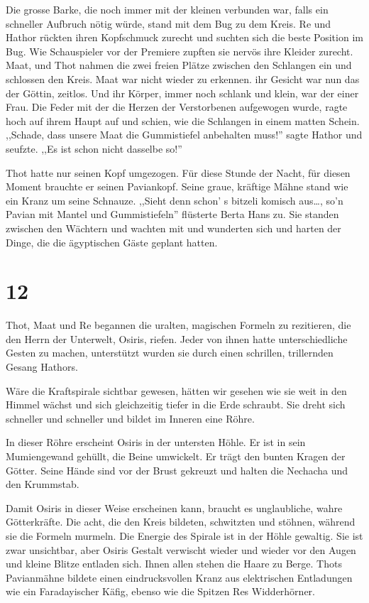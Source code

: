 \documentclass[11pt,titlepage,a5paper]{book}
\begin{document}
Die grosse Barke, die noch immer mit der kleinen verbunden war, falls ein schneller Aufbruch nötig würde, stand mit dem Bug zu dem Kreis. Re und Hathor rückten ihren Kopfschmuck zurecht und suchten sich die beste Position im Bug. Wie Schauspieler vor der Premiere zupften sie nervös ihre Kleider zurecht. Maat, und Thot nahmen die zwei freien Plätze zwischen den Schlangen ein und schlossen den Kreis. Maat war nicht wieder zu erkennen. ihr Gesicht war nun das der Göttin, zeitlos. Und ihr Körper, immer noch schlank und klein, war der einer Frau. Die Feder mit der die Herzen der Verstorbenen aufgewogen wurde, ragte hoch auf ihrem Haupt auf und schien, wie die Schlangen in einem matten Schein. ,,Schade, dass unsere Maat die Gummistiefel anbehalten muss!'' sagte Hathor und seufzte. ,,Es ist schon nicht dasselbe so!''

Thot hatte nur seinen Kopf umgezogen. Für diese Stunde der Nacht, für diesen Moment brauchte er seinen Paviankopf. Seine graue, kräftige Mähne stand wie ein Kranz um seine Schnauze. ,,Sieht denn schon' s bitzeli komisch aus\dots, so'n Pavian mit Mantel und Gummistiefeln'' flüsterte Berta Hans zu. Sie standen zwischen den Wächtern und wachten mit und wunderten sich und harten der Dinge, die die ägyptischen Gäste geplant hatten.


\section*{12}

Thot, Maat und Re begannen die uralten, magischen Formeln zu rezitieren, die den Herrn der Unterwelt, Osiris, riefen. Jeder von ihnen hatte unterschiedliche Gesten zu machen, unterstützt wurden sie durch einen schrillen, trillernden Gesang Hathors.

Wäre die Kraftspirale sichtbar gewesen, hätten wir gesehen wie sie weit in den Himmel wächst und sich gleichzeitig tiefer in die Erde schraubt. Sie dreht sich schneller und schneller und bildet im Inneren eine Röhre. 

In dieser Röhre erscheint Osiris in der untersten Höhle. Er ist in sein Mumiengewand gehüllt, die Beine umwickelt. Er trägt den bunten Kragen der Götter. Seine Hände sind vor der Brust gekreuzt und halten die Nechacha und den Krummstab.

Damit Osiris in dieser Weise erscheinen kann, braucht es unglaubliche, wahre Götterkräfte. Die acht, die den Kreis bildeten, schwitzten und stöhnen, während sie die Formeln murmeln. Die Energie des Spirale ist in der Höhle gewaltig. Sie ist zwar unsichtbar, aber Osiris Gestalt verwischt wieder und wieder vor den Augen und kleine Blitze entladen sich. Ihnen allen stehen die Haare zu Berge. Thots Pavianmähne bildete einen eindrucksvollen Kranz aus elektrischen Entladungen wie ein Faradayischer Käfig, ebenso wie die Spitzen Res Widderhörner. 
\end{document}
